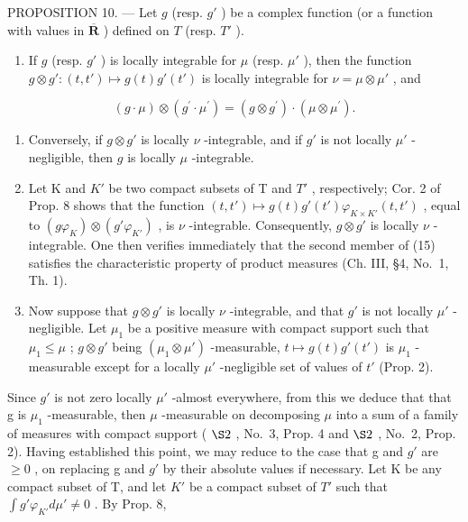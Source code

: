 PROPOSITION 10. --- Let \(g\) (resp. \(g'\) ) be a complex function (or a function with values in \(\overline{\mathbf{R}}\) ) defined on \(T\) (resp. \(T'\) ).

\begin{enumerate}
\def\labelenumi{\alph{enumi})}
\tightlist
\item
  If \(g\) (resp. \(g'\) ) is locally integrable for \(\mu\) (resp. \(\mu'\) ), then the function \(g \otimes g': (t, t') \mapsto g(t)g'(t')\) is locally integrable for \(\nu = \mu \otimes \mu'\) , and
\end{enumerate}

\[
(g \cdot \mu) \otimes (g ^ {\prime} \cdot \mu^ {\prime}) = (g \otimes g ^ {\prime}) \cdot (\mu \otimes \mu^ {\prime}).\tag{15}
\]

\begin{enumerate}
\def\labelenumi{\alph{enumi})}
\setcounter{enumi}{1}
\item
  Conversely, if \(g \otimes g'\) is locally \(\nu\) -integrable, and if \(g'\) is not locally \(\mu'\) -negligible, then \(g\) is locally \(\mu\) -integrable.
\item
  Let K and \(K'\) be two compact subsets of T and \(T'\) , respectively; Cor. 2 of Prop. 8 shows that the function \((t, t') \mapsto g(t)g'(t')\varphi_{K \times K'}(t, t')\) , equal to \((g\varphi_{K}) \otimes (g'\varphi_{K'})\) , is \(\nu\) -integrable. Consequently, \(g \otimes g'\) is locally \(\nu\) -integrable. One then verifies immediately that the second member of (15) satisfies the characteristic property of product measures (Ch. III, §4, No.~1, Th. 1).
\item
  Now suppose that \(g \otimes g'\) is locally \(\nu\) -integrable, and that \(g'\) is not locally \(\mu'\) -negligible. Let \(\mu_1\) be a positive measure with compact support such that \(\mu_1 \leqslant \mu\) ; \(g \otimes g'\) being \((\mu_1 \otimes \mu')\) -measurable, \(t \mapsto g(t)g'(t')\) is \(\mu_1\) -measurable except for a locally \(\mu'\) -negligible set of values of \(t'\) (Prop. 2).
\end{enumerate}

Since \(g'\) is not zero locally \(\mu'\) -almost everywhere, from this we deduce that that g is \(\mu_{1}\) -measurable, then \(\mu\) -measurable on decomposing \(\mu\) into a sum of a family of measures with compact support ( \(\S2\) , No.~3, Prop. 4 and \(\S2\) , No.~2, Prop. 2). Having established this point, we may reduce to the case that g and \(g'\) are \(\geqslant0\) , on replacing g and \(g'\) by their absolute values if necessary. Let K be any compact subset of T, and let \(K'\) be a compact subset of \(T'\) such that \(\int g'\varphi_{K'}d\mu'\neq0\) . By Prop. 8,

